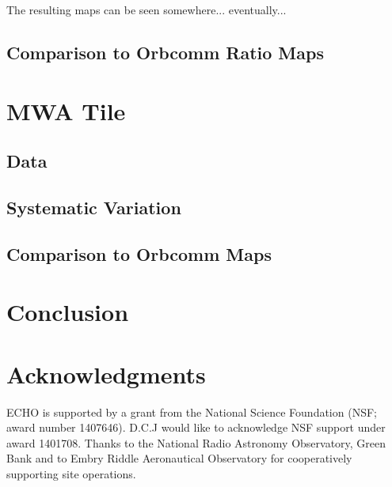 \documentclass[preprint2]{aastex}
\begin{document}
The resulting maps can be seen somewhere... eventually...

\subsection{Comparison to Orbcomm Ratio Maps}
\section{MWA Tile}
\subsection{Data}
\subsection{Systematic Variation}
\subsection{Comparison to Orbcomm Maps}
\section{Conclusion}


\section{Acknowledgments}{

ECHO is supported by a grant from the National Science Foundation (NSF; award number 1407646). D.C.J would like to acknowledge NSF support  under award 1401708.
Thanks to the National Radio Astronomy Observatory, Green Bank and to Embry Riddle Aeronautical Observatory for cooperatively supporting site operations.
}




\end{document}
